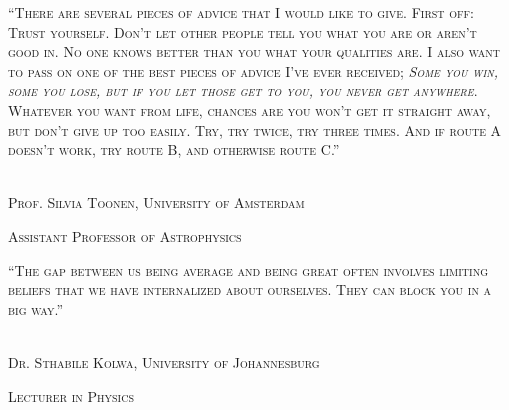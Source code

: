\documentclass[12pt]{article}
\begin{document}


\pagebreak
\strut \vspace{150pt}

\noindent \textsc{``There are several pieces of advice that I would like to give. First off: Trust yourself. Don't let other people tell you what you are or aren't good in. No one knows better than you what your qualities are. I also want to pass on one of the best pieces of advice I've ever received; \textsl{Some you win, some you lose, but if you let those get to you, you never get anywhere}. Whatever you want from life, chances are you won't get it straight away, but don't give up too easily. Try, try twice, try three times. And if route A doesn't work, try route B, and otherwise route C.''}
\\
\\
\strut\hfill \textemdash \textsc{Prof. Silvia Toonen, University of Amsterdam}\\
\strut \hfill \footnotesize{\textsc{Assistant Professor of Astrophysics}}
\normalsize



\pagebreak
\strut \vspace{225pt}

\noindent \textsc{``The gap between us being average and being great often involves limiting beliefs that we have internalized about ourselves. They can block you in a big way.''}
\\
\\
\strut\hfill \textemdash \textsc{Dr. Sthabile Kolwa, University of Johannesburg}\\
\strut \hfill \footnotesize{\textsc{Lecturer in Physics}}
\normalsize

\pagebreak


\pagebreak

\end{document}
